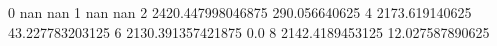 0 nan nan
1 nan nan
2 2420.447998046875 290.056640625
4 2173.619140625 43.227783203125
6 2130.391357421875 0.0
8 2142.4189453125 12.027587890625
